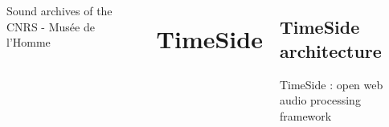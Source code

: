 \documentclass[final, hyperref, table]{beamer}
\begin{document}
\begin{frame}[containsverbatim]{}
\begin{columns}[T]
\begin{column}[T]{.49\linewidth}
\begin{block}{Sound archives of the CNRS - Musée de l'Homme}
            \begin{center}
            \end{center}


      \end{block}
      
      
    \end{column}
\section{TimeSide}
\begin{column}[T]{.49\linewidth}
\subsection{TimeSide architecture}
  \begin{block}{TimeSide : open web audio processing framework}


\end{block}
\end{column}
\end{columns}
\end{frame}
\end{document}
